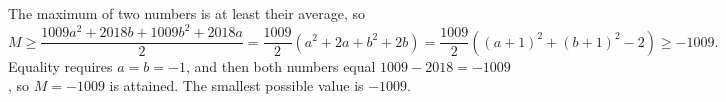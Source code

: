 The maximum of two numbers is at least their average, so
\[
M\ge\dfrac{1009a^2+2018b+1009b^2+2018a}{2}=\dfrac{1009}{2}\left(a^2+2a+b^2+2b\right)=\dfrac{1009}{2}\left((a+1)^2+(b+1)^2-2\right)\ge-1009 .
\]
Equality requires $a=b=-1$, and then both numbers equal $1009-2018=-1009$, so $M=-1009$ is attained. The smallest possible value is $\boxed{-1009}$.

